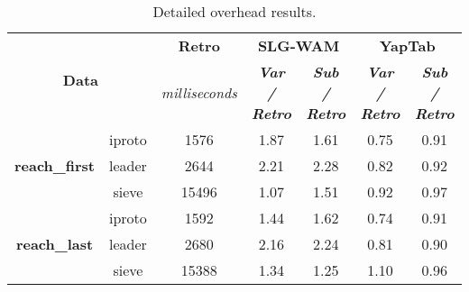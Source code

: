 \begin{table}[ht]
\centering
\footnotesize{
  \begin{tabular}{cc|c|cc|cc}
   \hline
    \hline
    \multicolumn{2}{c|}{\multirow{2}{*}{\small{\textbf{Data}}}} & \textbf{\small{Retro}} & \multicolumn{2}{c|}{\small{\textbf{SLG-WAM}}} & \multicolumn{2}{c}{\small{\textbf{YapTab}}} \\
     \multicolumn{2}{c|}{} & \scriptsize{\textit{milliseconds}} & \textbf{\textit{\scriptsize{Var / Retro}}} & \textbf{\textit{\scriptsize{Sub / Retro}}} & \textbf{\textit{\scriptsize{Var / Retro}}} & \textbf{\textit{\scriptsize{Sub / Retro}}} \\
   \hline
   \hline

\multirow{3}{*}{\textbf{reach\_first}} &  iproto &  1576 &  1.87  &  1.61  &  0.75 & 0.91 \\
&  leader &  2644 &  2.21  &  2.28  &  0.82 & 0.92 \\
&  sieve &  15496 &  1.07  &  1.51  &  0.92 & 0.97 \\
\hline
\multirow{3}{*}{\textbf{reach\_last}} &  iproto &  1592 &  1.44  &  1.62  &  0.74 & 0.91 \\
&  leader &  2680 &  2.16  &  2.24  &  0.81 & 0.90 \\
&  sieve &  15388 &  1.34  &  1.25  &  1.10 & 0.96 \\
\hline
\hline
\end{tabular}
}
\caption{Detailed overhead results.}
\label{tbl:overhead_detail_model}
\end{table}